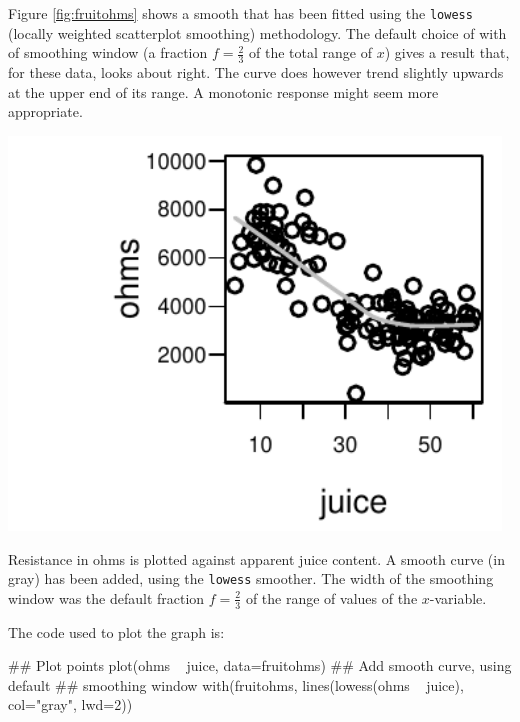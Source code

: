 \documentclass{tufte-book}\usepackage[]{graphicx}\usepackage[]{color}
\newcommand{\txtt}[1]{\texttt{#1}}
\begin{document}
Figure \ref{fig:fruitohms} shows a smooth that has been fitted using
the \txtt{lowess} (locally weighted scatterplot smoothing)
methodology.  The default choice of with of smoothing window (a fraction
$f = \frac{2}{3}$ of the total range of $x$) gives a result that,
for these data, looks about right. The curve does however trend
slightly upwards at the upper end of its range.  A monotonic
response might seem more appropriate.

\begin{marginfigure}
\begin{Schunk}


\centerline{\includegraphics[width=0.98\textwidth]{figs/12-smooth-ohms-1} }

\end{Schunk}
  \caption{Resistance in ohms is plotted against apparent juice
    content.  A smooth curve (in gray) has been added, using the
    \txtt{lowess} smoother.  The width of the smoothing window was the
    default fraction $f = \frac{2}{3}$ of the range of values of the
    $x$-variable.}\label{fig:fruitohms}
\end{marginfigure}

The code used to plot the graph is:
\begin{Schunk}
\begin{Sinput}
## Plot points
plot(ohms ~ juice, data=fruitohms)
## Add smooth curve, using default
## smoothing window
with(fruitohms,
     lines(lowess(ohms ~ juice), col="gray", lwd=2))
\end{Sinput}
\end{Schunk}
\end{document}
